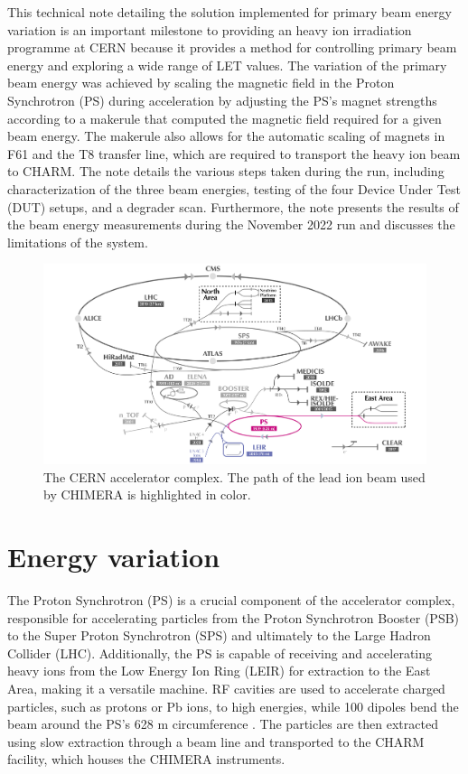 \documentclass{cernatsnote}
\begin{document}
This technical note detailing the solution implemented for primary beam energy variation is an important milestone to providing an heavy ion irradiation programme at CERN because it provides a method for controlling primary beam energy and exploring a wide range of LET values. The variation of the primary beam energy was achieved by scaling the magnetic field in the Proton Synchrotron (PS) during acceleration by adjusting the PS's magnet strengths according to a makerule that computed the magnetic field required for a given beam energy. The makerule also allows for the automatic scaling of magnets in F61 and the T8 transfer line, which are required to transport the heavy ion beam to CHARM. The note details the various steps taken during the run, including characterization of the three beam energies, testing of the four Device Under Test (DUT) setups, and a degrader scan. Furthermore, the note presents the results of the beam energy measurements during the November 2022 run and discusses the limitations of the system.

\begin{figure}[!htb]
\centering
\includegraphics[width=1.0\textwidth]{images/CCC_eastt8_small.png}
\caption{The CERN accelerator complex. The path of the lead ion beam used by CHIMERA is highlighted in color.}
\label{fig:CCC}
\end{figure}


\section{Energy variation}

The Proton Synchrotron (PS) is a crucial component of the accelerator complex, responsible for accelerating particles from the Proton Synchrotron Booster (PSB) to the Super Proton Synchrotron (SPS) and ultimately to the Large Hadron Collider (LHC). Additionally, the PS is capable of receiving and accelerating heavy ions from the Low Energy Ion Ring (LEIR) for extraction to the East Area, making it a versatile machine. RF cavities are used to accelerate charged particles, such as protons or Pb ions, to high energies, while 100 dipoles bend the beam around the PS's 628 m circumference \cite{gilardoni_fifty_2011}. The particles are then extracted using slow extraction through a beam line and transported to the CHARM facility, which houses the CHIMERA instruments.
\\
\end{document}
